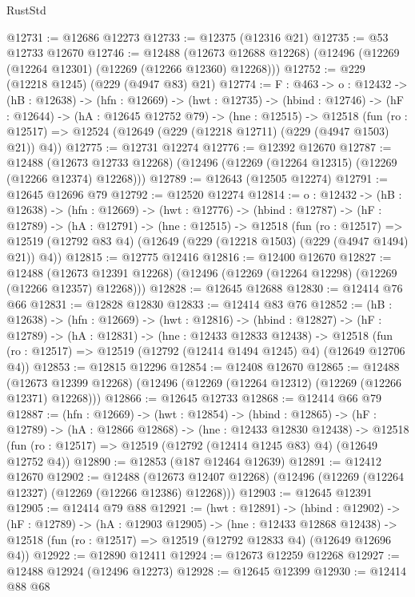 \begin{lexlean}{RustStd}
\begin{coremodule}
@12731 := @12686 @12273
@12733 := @12375 (@12316 @21)
@12735 := @53 @12733 @12670
@12746 := @12488
    (@12673 @12688 @12268)
    (@12496 (@12269 (@12264 @12301) (@12269 (@12266 @12360) @12268)))
@12752 := @229 (@12218 @1245) (@229 (@4947 @83) @21)
@12774 := {F : @463} ->
  {o : @12432} ->
  (hB : @12638) ->
  (hfn : @12669) ->
  (hwt : @12735) ->
  (hbind : @12746) ->
  (hF : @12644) ->
  (hA : @12645 @12752 @79) ->
  (hne : @12515) ->
  @12518 (fun (ro : @12517) => @12524 (@12649 (@229 (@12218 @12711) (@229 (@4947 @1503) @21)) @4))
@12775 := @12731 @12274
@12776 := @12392 @12670
@12787 := @12488
    (@12673 @12733 @12268)
    (@12496 (@12269 (@12264 @12315) (@12269 (@12266 @12374) @12268)))
@12789 := @12643 (@12505 @12274)
@12791 := @12645 @12696 @79
@12792 := @12520 @12274
@12814 := {o : @12432} ->
  (hB : @12638) ->
  (hfn : @12669) ->
  (hwt : @12776) ->
  (hbind : @12787) ->
  (hF : @12789) ->
  (hA : @12791) ->
  (hne : @12515) ->
  @12518
    (fun (ro : @12517) =>
    @12519 (@12792 @83 @4) (@12649 (@229 (@12218 @1503) (@229 (@4947 @1494) @21)) @4))
@12815 := @12775 @12416
@12816 := @12400 @12670
@12827 := @12488
    (@12673 @12391 @12268)
    (@12496 (@12269 (@12264 @12298) (@12269 (@12266 @12357) @12268)))
@12828 := @12645 @12688
@12830 := @12414 @76 @66
@12831 := @12828 @12830
@12833 := @12414 @83 @76
@12852 := (hB : @12638) ->
  (hfn : @12669) ->
  (hwt : @12816) ->
  (hbind : @12827) ->
  (hF : @12789) ->
  (hA : @12831) ->
  (hne : @12433 @12833 @12438) ->
  @12518 (fun (ro : @12517) => @12519 (@12792 (@12414 @1494 @1245) @4) (@12649 @12706 @4))
@12853 := @12815 @12296
@12854 := @12408 @12670
@12865 := @12488
    (@12673 @12399 @12268)
    (@12496 (@12269 (@12264 @12312) (@12269 (@12266 @12371) @12268)))
@12866 := @12645 @12733
@12868 := @12414 @66 @79
@12887 := (hfn : @12669) ->
  (hwt : @12854) ->
  (hbind : @12865) ->
  (hF : @12789) ->
  (hA : @12866 @12868) ->
  (hne : @12433 @12830 @12438) ->
  @12518 (fun (ro : @12517) => @12519 (@12792 (@12414 @1245 @83) @4) (@12649 @12752 @4))
@12890 := @12853 (@187 @12464 @12639)
@12891 := @12412 @12670
@12902 := @12488
    (@12673 @12407 @12268)
    (@12496 (@12269 (@12264 @12327) (@12269 (@12266 @12386) @12268)))
@12903 := @12645 @12391
@12905 := @12414 @79 @88
@12921 := (hwt : @12891) ->
  (hbind : @12902) ->
  (hF : @12789) ->
  (hA : @12903 @12905) ->
  (hne : @12433 @12868 @12438) ->
  @12518 (fun (ro : @12517) => @12519 (@12792 @12833 @4) (@12649 @12696 @4))
@12922 := @12890 @12411
@12924 := @12673 @12259 @12268
@12927 := @12488 @12924 (@12496 @12273)
@12928 := @12645 @12399
@12930 := @12414 @88 @68

\end{coremodule}
\end{lexlean}
